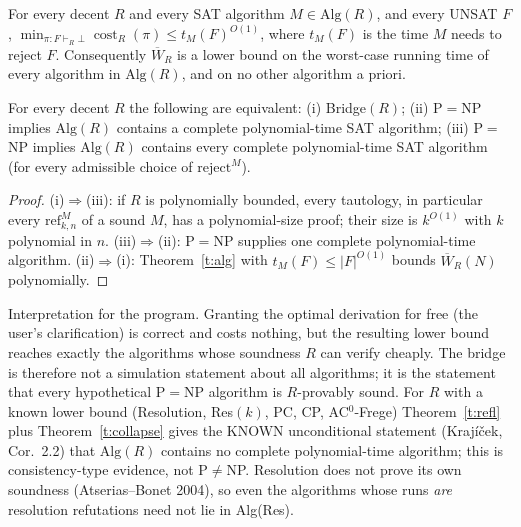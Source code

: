 \documentclass[11pt]{article}
\begin{document}
\begin{theorem}\label{t:alg}
For every decent $R$ and every SAT algorithm $M\in\mathrm{Alg}(R)$, and every UNSAT $F$,
$\min_{\pi:F\vdash_R\bot}\operatorname{cost}_R(\pi)\le t_M(F)^{O(1)}$, where $t_M(F)$ is the
time $M$ needs to reject $F$. Consequently $\overline W_R$ is a lower bound on the worst-case
running time of every algorithm in $\mathrm{Alg}(R)$, and on no other algorithm a priori.
\end{theorem}

\begin{theorem}\label{t:refl}
For every decent $R$ the following are equivalent:
(i) Bridge$(R)$;
(ii) P$=$NP implies $\mathrm{Alg}(R)$ contains a complete polynomial-time SAT algorithm;
(iii) P$=$NP implies $\mathrm{Alg}(R)$ contains every complete polynomial-time SAT algorithm
(for every admissible choice of $\mathrm{reject}^M$).
\end{theorem}
\begin{proof}
(i)$\Rightarrow$(iii): if $R$ is polynomially bounded, every tautology, in particular every
$\mathrm{ref}^M_{k,n}$ of a sound $M$, has a polynomial-size proof; their size is $k^{O(1)}$
with $k$ polynomial in $n$. (iii)$\Rightarrow$(ii): P$=$NP supplies one complete
polynomial-time algorithm. (ii)$\Rightarrow$(i): Theorem~\ref{t:alg} with
$t_M(F)\le|F|^{O(1)}$ bounds $\overline W_R(N)$ polynomially.
\end{proof}
Interpretation for the program. Granting the optimal derivation for free (the user's
clarification) is correct and costs nothing, but the resulting lower bound reaches exactly
the algorithms whose soundness $R$ can verify cheaply. The bridge is therefore not a
simulation statement about all algorithms; it is the statement that every hypothetical
P$=$NP algorithm is $R$-provably sound. For $R$ with a known lower bound (Resolution,
Res$(k)$, PC, CP, AC$^0$-Frege) Theorem~\ref{t:refl} plus Theorem~\ref{t:collapse} gives the
KNOWN unconditional statement (Kraj\'i\v{c}ek, Cor.~2.2) that $\mathrm{Alg}(R)$ contains no
complete polynomial-time algorithm; this is consistency-type evidence, not P$\ne$NP.
Resolution does not prove its own soundness (Atserias--Bonet 2004), so even the
algorithms whose runs \emph{are} resolution refutations need not lie in Alg(Res).
\end{document}
